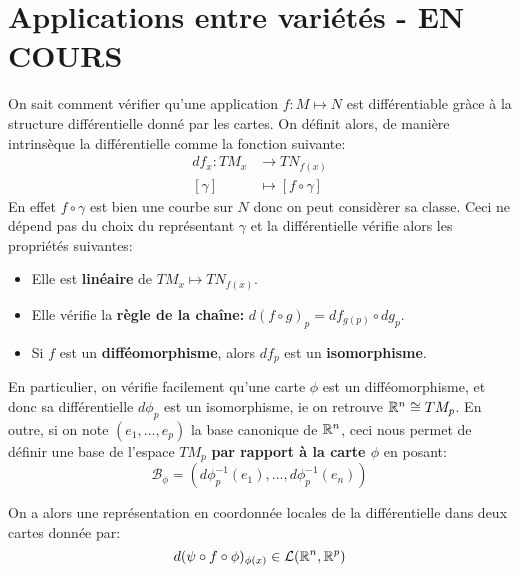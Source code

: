 \section{Applications entre variétés - EN COURS}
On sait comment vérifier qu'une application \( f : M \longmapsto N \) est différentiable gràce à la structure différentielle donné par les cartes. On définit alors, de manière intrinsèque la différentielle comme la fonction suivante:
\[ 
   \begin{aligned}
      df_x : TM_x &\longrightarrow TN_{f(x)} \\
      [\gamma] &\longmapsto [f \circ \gamma]
   \end{aligned}
\]
En effet \( f \circ \gamma \) est bien une courbe sur \( N \) donc on peut considèrer sa classe. Ceci ne dépend pas du choix du représentant \( \gamma \) et la différentielle vérifie alors les propriétés suivantes:
\begin{itemize}
   \item Elle est \textbf{linéaire} de \( TM_x \mapsto TN_{f(x)} \).
   \item Elle vérifie la \textbf{règle de la chaîne:} \( d(f \circ g)_p = df_{g(p)} \circ dg_p\).
   \item Si \( f \) est un \textbf{difféomorphisme}, alors \( df_p \) est un \textbf{isomorphisme}.
\end{itemize}
En particulier, on vérifie facilement qu'une carte \( \phi \) est un difféomorphisme, et donc sa différentielle \( d\phi_p\) est un isomorphisme, ie on retrouve \( \mathbb{R}^n \cong TM_p \). En outre, si on note \( (e_1, \ldots, e_p) \) la base canonique de \( \mathbb{R}^n \), ceci nous permet de définir une base de l'espace \( TM_p \) \textbf{par rapport à la carte \( \phi \)} en posant:
\[ 
   \mathcal{B}_\phi = (d\phi_{p}^{-1}(e_1), \ldots, d\phi_p^{-1}(e_n)) 
\]

On a alors une représentation en coordonnée locales de la différentielle dans deux cartes donnée par:
\[ 
   d(\psi \circ f \circ \phi)_{\phi(x)} \in \mathcal{L}( \mathbb{R}^n, \mathbb{R}^p) 
\]
